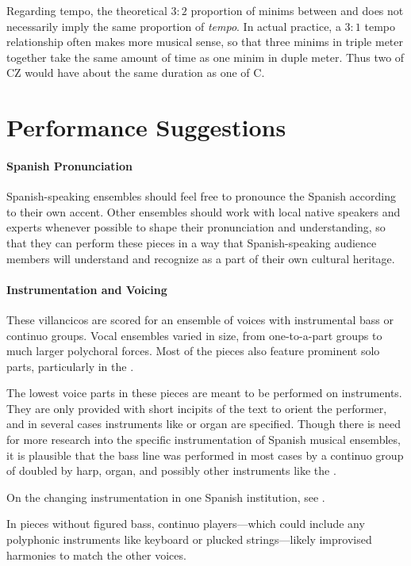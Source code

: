 Regarding tempo, the theoretical $3:2$ proportion of minims between
\meterCThreeTwo and \meterC{} does not necessarily imply the same proportion of
\emph{tempo}.  
In actual practice, a $3:1$ tempo relationship often makes more musical sense,
so that three minims in triple meter together take the same amount of time as
one minim in duple meter.
Thus two  of CZ would have about the same duration as one 
 of C.

\section*{Performance Suggestions}

\paragraph{Spanish Pronunciation}
Spanish-speaking ensembles should feel free to pronounce the Spanish according
to their own accent.
Other ensembles should work with local native speakers and experts whenever
possible to shape their pronunciation and understanding, so that they can
perform these pieces in a way that Spanish-speaking audience members will
understand and recognize as a part of their own cultural heritage.

\paragraph{Instrumentation and Voicing}
These villancicos are scored for an ensemble of voices with instrumental bass 
or continuo groups.
Vocal ensembles varied in size, from one-to-a-part groups to much larger 
polychoral forces.
Most of the pieces also feature prominent solo parts, particularly in the 
.

The lowest voice parts in these pieces are meant to be performed on instruments. 
They are only provided with short incipits of the text to orient the 
performer, and in several cases instruments like  or organ are specified.
Though there is need for more research into the specific instrumentation of 
Spanish musical ensembles, it is plausible that the bass line was performed in 
most cases by a continuo group of  doubled by harp, organ, and 
possibly other instruments like the .%
\begin{Footnote}
    On the changing instrumentation in one Spanish institution, see 
    \autocite{Torrente:PhD}.
\end{Footnote}
In pieces without figured bass, continuo players---which could include any
polyphonic instruments like keyboard or plucked strings---likely improvised
harmonies to match the other voices.


